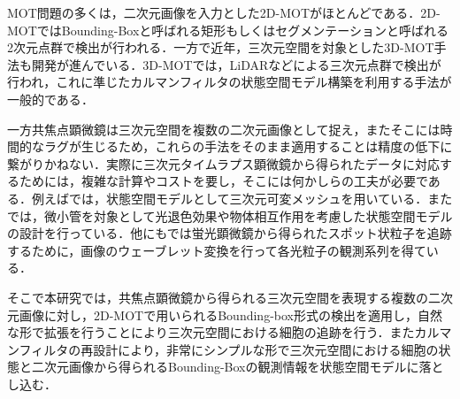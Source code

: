 MOT問題の多くは，二次元画像を入力とした2D-MOTがほとんどである．2D-MOTではBounding-Boxと呼ばれる矩形もしくはセグメンテーションと呼ばれる2次元点群で検出が行われる．一方で近年，三次元空間を対象とした3D-MOT手法も開発が進んでいる．3D-MOTでは，LiDARなどによる三次元点群で検出が行われ，これに準じたカルマンフィルタの状態空間モデル構築を利用する手法が一般的である\cite{wang2023camo,wang2022deepfusionmot}．

一方共焦点顕微鏡は三次元空間を複数の二次元画像として捉え，またそこには時間的なラグが生じるため，これらの手法をそのまま適用することは精度の低下に繋がりかねない．実際に三次元タイムラプス顕微鏡から得られたデータに対応するためには，複雑な計算やコストを要し，そこには何かしらの工夫が必要である．例えば\cite{5676210}では，状態空間モデルとして三次元可変メッシュを用いている．また\cite{smal2008particle}では，微小管を対象として光退色効果や物体相互作用を考慮した状態空間モデルの設計を行っている．他にも\cite{1621229}では蛍光顕微鏡から得られたスポット状粒子を追跡するために，画像のウェーブレット変換を行って各光粒子の観測系列を得ている．

そこで本研究では，共焦点顕微鏡から得られる三次元空間を表現する複数の二次元画像に対し，2D-MOTで用いられるBounding-box形式の検出を適用し，自然な形で拡張を行うことにより三次元空間における細胞の追跡を行う．またカルマンフィルタの再設計により，非常にシンプルな形で三次元空間における細胞の状態と二次元画像から得られるBounding-Boxの観測情報を状態空間モデルに落とし込む．
